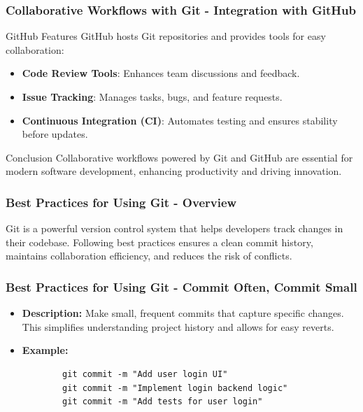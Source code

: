 \documentclass{beamer}
\begin{document}
\begin{frame}[fragile]
    \frametitle{Collaborative Workflows with Git - Integration with GitHub}
    \begin{block}{GitHub Features}
        GitHub hosts Git repositories and provides tools for easy collaboration:
        \begin{itemize}
            \item \textbf{Code Review Tools}: Enhances team discussions and feedback.
            \item \textbf{Issue Tracking}: Manages tasks, bugs, and feature requests.
            \item \textbf{Continuous Integration (CI)}: Automates testing and ensures stability before updates.
        \end{itemize}
    \end{block}
    
    \begin{block}{Conclusion}
        Collaborative workflows powered by Git and GitHub are essential for modern software development, enhancing productivity and driving innovation.
    \end{block}
\end{frame}

\begin{frame}[fragile]
    \frametitle{Best Practices for Using Git - Overview}
    Git is a powerful version control system that helps developers track changes in their codebase. Following best practices ensures a clean commit history, maintains collaboration efficiency, and reduces the risk of conflicts.
\end{frame}

\begin{frame}[fragile]
    \frametitle{Best Practices for Using Git - Commit Often, Commit Small}
    \begin{itemize}
        \item \textbf{Description:} Make small, frequent commits that capture specific changes. This simplifies understanding project history and allows for easy reverts.
        \item \textbf{Example:}
        \begin{lstlisting}
        git commit -m "Add user login UI"
        git commit -m "Implement login backend logic"
        git commit -m "Add tests for user login"
        \end{lstlisting}
    \end{itemize}
\end{frame}
\end{document}

